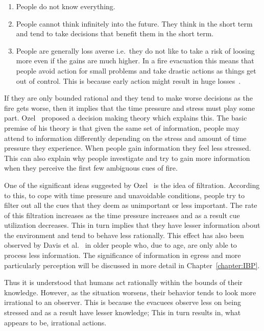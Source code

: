 \begin{enumerate}
\item People do not know everything.
\item People cannot think infinitely into the future. They think in the short term and tend to take decisions that benefit them in the short term.
\item People are generally loss averse i.e.\ they do not like to take a risk of loosing more even if the gains are much higher. In a fire evacuation this means that people avoid action for small problems and take drastic actions as things get out of control. This is because early action might result in huge losses~\cite{Graham:2000vl}.
\end{enumerate}

If they are only bounded rational and they tend to make worse decisions as the fire gets worse, then it implies that the time pressure and stress must play some part. Ozel~\cite{Ozel:2001tn} proposed a decision making theory which explains this. The basic premise of his theory is that given the same set of information, people may attend to information differently depending on the stress and amount of time pressure they experience. When people gain information they feel less stressed. This can also explain why people investigate and try to gain more information when they perceive the first few ambiguous cues of fire.

One of the significant ideas suggested by Ozel~\cite{Ozel:2001tn} is the idea of filtration. According to this, to cope with time pressure and unavoidable conditions, people try to filter out all the cues that they deem as unimportant or less important. The rate of this filtration increases as the time pressure increases and as a result cue utilization decreases. This in turn implies that they have lesser information about the environment and tend to behave less rationally. This effect has also been observed by Davis et al.~\cite{Davis01122009} in older people who, due to age, are only able to process less information. The significance of information in egress and more particularly perception will be discussed in more detail in Chapter~\ref{chapter:IBP}.

Thus it is understood that humans act rationally within the bounds of their knowledge. However, as the situation worsens, their behavior tends to look more irrational to an observer. This is because the evacuees observe less on being stressed and as a result have lesser knowledge; This in turn results in, what appears to be, irrational actions.

